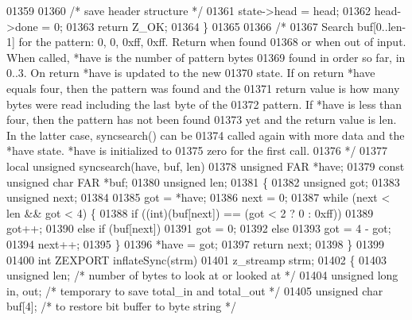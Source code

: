 \begin{DoxyCode}
{{{{{{{{{{{{01359 
01360     \textcolor{comment}{/* save header structure */}
01361     state->head = head;
01362     head->done = 0;
01363     \textcolor{keywordflow}{return} Z\_OK;
01364 \}
01365 
01366 \textcolor{comment}{/*}
01367 \textcolor{comment}{   Search buf[0..len-1] for the pattern: 0, 0, 0xff, 0xff.  Return when found}
01368 \textcolor{comment}{   or when out of input.  When called, *have is the number of pattern bytes}
01369 \textcolor{comment}{   found in order so far, in 0..3.  On return *have is updated to the new}
01370 \textcolor{comment}{   state.  If on return *have equals four, then the pattern was found and the}
01371 \textcolor{comment}{   return value is how many bytes were read including the last byte of the}
01372 \textcolor{comment}{   pattern.  If *have is less than four, then the pattern has not been found}
01373 \textcolor{comment}{   yet and the return value is len.  In the latter case, syncsearch() can be}
01374 \textcolor{comment}{   called again with more data and the *have state.  *have is initialized to}
01375 \textcolor{comment}{   zero for the first call.}
01376 \textcolor{comment}{ */}
01377 local \textcolor{keywordtype}{unsigned} syncsearch(have, buf, len)
01378 \textcolor{keywordtype}{unsigned} FAR *have;
01379 \textcolor{keyword}{const} \textcolor{keywordtype}{unsigned} \textcolor{keywordtype}{char} FAR *buf;
01380 \textcolor{keywordtype}{unsigned} len;
01381 \{
01382     \textcolor{keywordtype}{unsigned} got;
01383     \textcolor{keywordtype}{unsigned} next;
01384 
01385     got = *have;
01386     next = 0;
01387     \textcolor{keywordflow}{while} (next < len && got < 4) \{
01388         \textcolor{keywordflow}{if} ((\textcolor{keywordtype}{int})(buf[next]) == (got < 2 ? 0 : 0xff))
01389             got++;
01390         \textcolor{keywordflow}{else} \textcolor{keywordflow}{if} (buf[next])
01391             got = 0;
01392         \textcolor{keywordflow}{else}
01393             got = 4 - got;
01394         next++;
01395     \}
01396     *have = got;
01397     \textcolor{keywordflow}{return} next;
01398 \}
01399 
01400 \textcolor{keywordtype}{int} ZEXPORT inflateSync(strm)
01401 z\_streamp strm;
01402 \{
01403     \textcolor{keywordtype}{unsigned} len;               \textcolor{comment}{/* number of bytes to look at or looked at */}
01404     \textcolor{keywordtype}{unsigned} \textcolor{keywordtype}{long} in, out;      \textcolor{comment}{/* temporary to save total\_in and total\_out */}
01405     \textcolor{keywordtype}{unsigned} \textcolor{keywordtype}{char} buf[4];       \textcolor{comment}{/* to restore bit buffer to byte string */}
}}}}}}}}}}}}
\end{DoxyCode}
